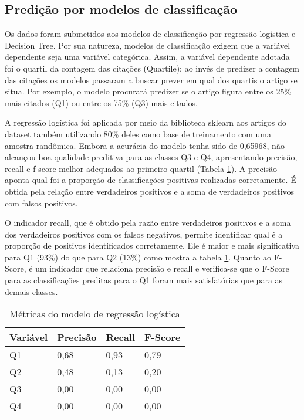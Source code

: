 \documentclass[runningheads]{llncs}
\begin{document}
\subsection{Predição por modelos de classificação}

Os dados foram submetidos aos modelos de classificação por regressão logística e Decision Tree. Por sua natureza, modelos de classificação exigem que a variável dependente seja uma variável categórica. Assim, a variável dependente adotada foi o quartil da contagem das citações (Quartile): ao invés de predizer a contagem das citações os modelos passaram a buscar prever em qual dos quartis o artigo se situa. Por exemplo, o modelo procurará predizer se o artigo figura entre os 25\% mais citados (Q1) ou entre os 75\% (Q3) mais citados.

A regressão logística foi aplicada por meio da biblioteca sklearn aos artigos do dataset também utilizando 80\% deles como base de treinamento com uma amostra randômica. Embora a acurácia do modelo tenha sido de 0,65968, não alcançou boa qualidade preditiva para as classes Q3 e Q4, apresentando precisão, recall e f-score melhor adequados ao primeiro quartil (Tabela \ref{tabmrl}). A precisão aponta qual foi a  proporção de classificações positivas realizadas corretamente. É obtida pela relação entre verdadeiros positivos e a soma de verdadeiros positivos com falsos positivos.

O indicador recall, que é obtido pela razão entre verdadeiros positivos e a soma dos verdadeiros positivos com os falsos negativos, permite identificar qual é a proporção de positivos identificados corretamente. Ele é maior e mais significativa para Q1 (93\%) do que para Q2 (13\%) como mostra a tabela \ref{tabmrl}. Quanto ao F-Score, é um indicador que relaciona precisão e recall e verifica-se que o F-Score para as classificações preditas para o Q1 foram mais satisfatórias que para as demais classes.

\begin{table}[]
    \centering
    \caption{Métricas do modelo de regressão logística}
    \label{tabmrl}
    \begin{tabular}{|l|l|l|l|}
         \hline
         Variável & Precisão & Recall & F-Score\\
         \hline
         Q1 & 0,68 & 0,93 & 0,79\\
         Q2 & 0,48 & 0,13 & 0,20\\
         Q3 & 0,00 & 0,00 & 0,00\\
         Q4 & 0,00 & 0,00 & 0,00\\
         \hline
    \end{tabular}
\end{table}
\end{document}

